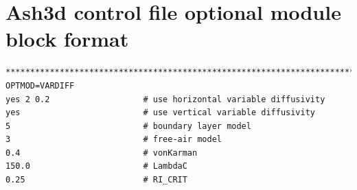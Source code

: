 \section{Ash3d control file optional module block format}\label{ChapAppendVarDiff_SecContrlBlock}

\footnotesize
\begin{verbatim}
*******************************************************************************
OPTMOD=VARDIFF
yes 2 0.2                   # use horizontal variable diffusivity
yes                         # use vertical variable diffusivity
5                           # boundary layer model
3                           # free-air model
0.4                         # vonKarman
150.0                       # LambdaC
0.25                        # RI_CRIT
\end{verbatim}
\normalsize



%



